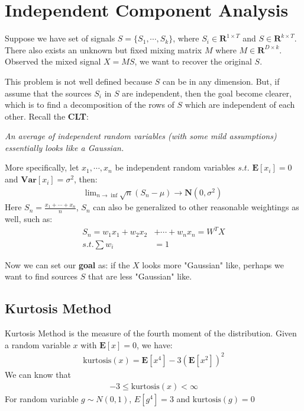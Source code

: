\section{Independent Component Analysis}
Suppose we have set of signals $ S = \{S_1, \cdots ,S_k \} $, where $S_i \in \textbf{R}^{1\times T}$ and $S \in \textbf{R}^{k\times T} $. There also exists an unknown but fixed mixing matrix $M$ where $M \in \textbf{R}^{D\times k} $. Observed the mixed signal $X = MS$, we want to recover the original $S$. 

This problem is not well defined because $S$ can be in any dimension. But, if assume that the sources $S_i$ in $S$ are independent, then the goal become clearer, which is to find a decomposition of the rows of $S$ which are independent of each other. Recall the \textbf{CLT}:

\textsl{An average of independent random variables (with some mild assumptions) essentially looks like a Gaussian.}

More specifically, let $x_1, \cdots , x_n$ be independent random variables $s.t.$ $\textbf{E}[x_i]=0$ and $\textbf{Var}[x_i] = \sigma ^2 $, then:
\begin{align*}
    \text{lim}_{n \to \inf} \sqrt{n}(S_n - \mu)  \to \textbf{N}(0,\sigma ^2)
\end{align*}
Here $S_n = \frac{x_1+ \cdots + x_n}{n}$, $S_n$ can also be generalized to other reasonable weightings as well, such as: 
\begin{align*}
    S_n = w_1x_1 + w_2x_2 & + \cdots + w_nx_n=W^TX \\
    s.t.  \sum w_i & = 1
\end{align*}

Now we can set our \textbf{goal} as: if the $X$ looks more "Gaussian" like, perhaps we want to find sources $S$ that are less "Gaussian" like. 

\subsection{Kurtosis Method}
Kurtosis Method is the measure of the fourth moment of the distribution. Given a random variable $x$ with $\textbf{E}[x] = 0$, we have:
\begin{align*}
    \text{kurtosis}(x) = \textbf{E}[x^4] - 3(\textbf{E}[x^2])^2
\end{align*}
We can know that 
\begin{align*}
     -3 \leq \text{kurtosis}(x) < \infty
\end{align*}
For random variable $g \sim N(0,1)$, $E[g^4] = 3$ and $\text{kurtosis}(g)=0$

